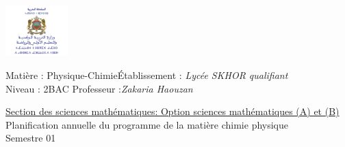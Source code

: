 \documentclass[12pt]{article}
\newcommand\headerMe[2]{\noindent{}#1\hfill#2}
\begin{document}
\begin{center}
\includegraphics[width = 0.18\textwidth]{./img/logoMin.png}
\vspace{-3cm}
\end{center}
\headerMe{Matière : Physique-Chimie}{Établissement : \emph{Lycée SKHOR qualifiant}}\\
\headerMe{ Niveau : 2BAC }{  Professeur :\emph{Zakaria Haouzan}}\\

\begin{center}
	\vspace{0.5cm}
\underline{Section des sciences mathématiques: Option sciences mathématiques (A) et (B)}
\\
\hrulefill
\Large{Planification annuelle
du programme de la matière chimie physique}
\hrulefill\\
\Large{Semestre 01}
\hrulefill\\

\end{center}
\end{document}
